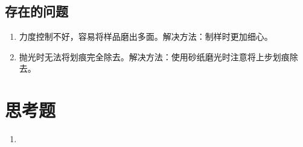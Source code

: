 \documentclass[a4paper,utf8]{article}
\begin{document}
    \subsection{存在的问题}
    \begin{enumerate}
        \item 力度控制不好，容易将样品磨出多面。解决方法：制样时更加细心。
        \item 抛光时无法将划痕完全除去。解决方法：使用砂纸磨光时注意将上步划痕除去。
    \end{enumerate}
\section{思考题}
\begin{enumerate}
    \item {}
\end{enumerate}
\end{document}

